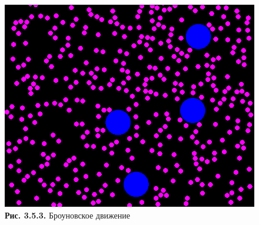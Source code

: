 \begin{figure}[ht]
 \centering
		\includegraphics[height =15 cm, keepaspectratio]{images/brownian.png}
		\caption{ \textbf{Рис. 3.5.3.} Броуновское движение}
	\end{figure}
 \hfill
  







